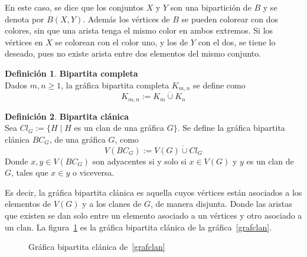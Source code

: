 \documentclass[12pt]{book}
\theoremstyle{definition}
\newtheorem{definition}{Definición}
\begin{document}
En este caso, se dice que los conjuntos $X$ y $Y$ son una
bipartición de $B$ y se denota por $B(X,Y)$. Además
los vértices de $B$ se pueden colorear con dos colores, sin que una
arista tenga el mismo color en ambos extremos. Si los vértices en $X$
se colorean con el color uno, y los de $Y$ con el dos, se tiene lo
deseado, pues no existe arista entre dos elementos del mismo conjunto.



\begin{definition}\textbf{Bipartita completa}\\
  Dados $m,n\geq 1$, la gráfica bipartita completa $K_{m,n}$ se define
  como $$K_{m,n}:=\overline{K_m \cup K_n}$$
\end{definition}


\begin{definition}\textbf{Bipartita clánica}\\
  Sea $Cl_G:=\{H \mid H$ es un clan de una gráfica $G \}$. Se define
  la gráfica bipartita clánica $BC_G$, de una gráfica $G$,
  como $$V(BC_G) := V(G) \dot{\cup} Cl_G$$ Donde $x,y\in V(BC_G)$ son
  adyacentes si y solo si $x\in V(G)$ y $y$ es un clan de $G$, tales
  que $x\in y$ o viceversa.
\end{definition}

Es decir, la gráfica bipartita clánica es aquella cuyos
vértices están asociados a los elementos de $V(G)$ y a los clanes de
$G$, de manera disjunta. Donde las aristas que existen se dan solo
entre un elemento asociado a un vértices y otro asociado a un clan. La
figura~\ref{BCG} es la gráfica bipartita clánica de la
gráfica~\ref{grafclan}.

\begin{figure}
  \centering
  \caption{Gráfica bipartita clánica de~\ref{grafclan}}\label{BCG}
\end{figure}
\end{document}
